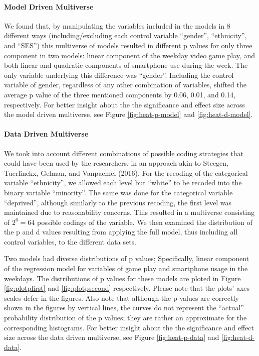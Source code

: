 \documentclass[man]{apa6}
\theoremstyle{definition}
\theoremstyle{definition}
\theoremstyle{definition}
\theoremstyle{remark}
\begin{document}
\hypertarget{model-driven-multiverse}{%
\paragraph{Model Driven Multiverse}\label{model-driven-multiverse}}

We found that, by manipulating the variables included in the models in 8
different ways (including/excluding each control variable
\enquote{gender}, \enquote{ethnicity}, and \enquote{SES}) this
multiverse of models resulted in different p values for only three
component in two models: linear component of the weekday video game
play, and both linear and quadratic components of smartphone use during
the week. The only variable underlying this difference was
\enquote{gender}. Including the control variable of gender, regardless
of any other combination of variables, shifted the average p value of
the three mentioned components by 0.06, 0.01, and 0.14, respectively.
For better insight about the the significance and effect size across the
model driven multiverse, see Figure \ref{fig:heat-p-model} and
\ref{fig:heat-d-model}.

\hypertarget{data-driven-multiverse}{%
\paragraph{Data Driven Multiverse}\label{data-driven-multiverse}}

We took into account different combinations of possible coding
strategies that could have been used by the researchers, in an approach
akin to Steegen, Tuerlinckx, Gelman, and Vanpaemel (2016). For the
recoding of the categorical variable \enquote{ethnicity}, we allowed
each level but \enquote{white} to be recoded into the binary variable
\enquote{minority}. The same was done for the categorical variable
\enquote{deprived}, although similarly to the previous recoding, the
first level was maintained due to reasonability concerns. This resulted
in a multiverse consisting of \(2^6 = 64\) possible codings of the
variable. We then examined the distribution of the p and d values
resulting from applying the full model, thus including all control
variables, to the different data sets.

Two models had diverse distributions of p values; Specifically, linear
component of the regression model for variables of game play and
smartphone usage in the weekdays. The distributions of p values for
these models are ploted in Figure \ref{fig:plotpfirst} and
\ref{fig:plotpsecond} respectively. Please note that the plots' axes
scales defer in the figures. Also note that although the p values are
correctly shown in the figures by vertical lines, the curves do not
represent the \enquote{actual} probability distribution of the p values;
they are rather an approximate for the corresponding histograms. For
better insight about the the significance and effect size across the
data driven multiverse, see Figure \ref{fig:heat-p-data} and
\ref{fig:heat-d-data}.
\end{document}
